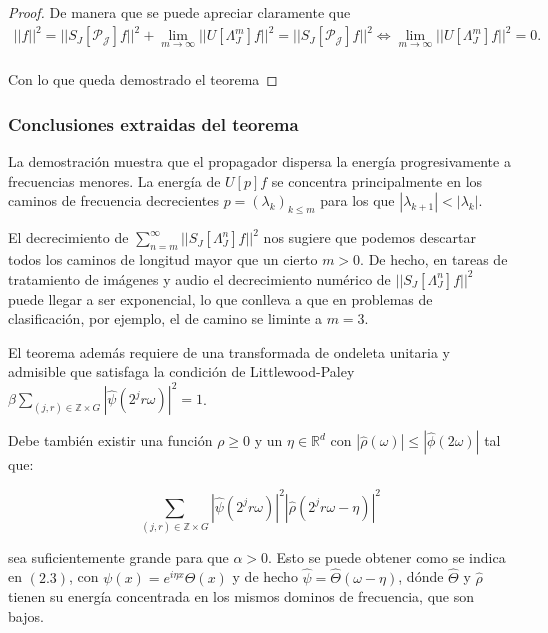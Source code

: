 \begin{proof}
  \noindent De manera que se puede apreciar claramente que  
  \begin{align*}
    ||f||^2 =||S_J[\mathcal{P_J}]f||^2 + \lim_{m\rightarrow \infty} ||U[\Lambda_J^m]f||^2  = ||S_J[\mathcal{P_J}]f||^2 \iff \lim_{m\rightarrow \infty} ||U[\Lambda_J^m]f||^2=0. \\
  \end{align*}

  \noindent Con lo que queda demostrado el teorema \qedhere
\end{proof}

\subsubsection{Conclusiones extraidas del teorema}
\noindent La demostración muestra que el propagador dispersa la energía progresivamente a frecuencias menores. La energía de $U[p]f$ se concentra principalmente en los caminos de frecuencia decrecientes $p=(\lambda_k)_{k\leq m}$ para los que $|\lambda_{k+1}|<|\lambda_k|$.


\medskip

\noindent El decrecimiento de $\sum_{n=m}^\infty || S_J[\Lambda_J^n]f||^2$ nos sugiere que podemos descartar todos los caminos de longitud mayor que un cierto $m>0$. De hecho, en tareas de tratamiento de imágenes y audio el decrecimiento numérico de $||S_J[\Lambda_J^n]f||^2$ puede llegar a ser exponencial, lo que conlleva a que en problemas de clasificación, por ejemplo, el de camino se liminte a $m=3$.

\medskip

\noindent El teorema además requiere de una transformada de ondeleta unitaria y admisible que satisfaga la condición de Littlewood-Paley $\beta \sum_{(j,r)\in \mathbb{Z}\times G}|\widehat{\psi}(2^jr\omega)|^2=1$. 

\medskip

\noindent Debe también existir una función $\rho \geq 0$ y un $\eta \in \mathbb{R}^d$ con $|\widehat{\rho}(\omega)|\leq |\widehat{\phi}(2\omega)|$ tal que: 

$$\sum_{(j,r)\in\mathbb{Z}\times G}|\widehat{\psi}(2^jr\omega)|^2|\widehat{\rho}(2^jr\omega-\eta)|^2$$

\noindent sea suficientemente grande para que $\alpha>0$. Esto se puede obtener como se indica en $(2.3)$, con $\psi(x)=e^{i\eta x}\Theta(x)$ y de hecho $\widehat{\psi}=\widehat{\Theta}(\omega-\eta)$, dónde $\widehat{\Theta}$ y $\widehat{\rho}$ tienen su energía concentrada en los mismos dominos de frecuencia, que son bajos.

